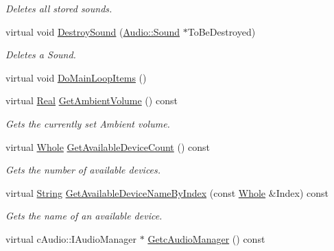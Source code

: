 \begin{DoxyCompactItemize}
\begin{DoxyCompactList}\small\item\em Deletes all stored sounds. \item\end{DoxyCompactList}\item 
virtual void \hyperlink{classMezzanine_1_1AudioManager_a6cd0e2faa6913722551a68b9a536c7dd}{DestroySound} (\hyperlink{classMezzanine_1_1Audio_1_1Sound}{Audio::Sound} $\ast$ToBeDestroyed)
\begin{DoxyCompactList}\small\item\em Deletes a Sound. \item\end{DoxyCompactList}\item 
virtual void \hyperlink{classMezzanine_1_1AudioManager_aefcdc7d3276500cf627f2c2e33b483f3}{DoMainLoopItems} ()
\item 
virtual \hyperlink{namespaceMezzanine_a726731b1a7df72bf3583e4a97282c6f6}{Real} \hyperlink{classMezzanine_1_1AudioManager_acb9f1413ab2260c181ded3ddca71d0dd}{GetAmbientVolume} () const 
\begin{DoxyCompactList}\small\item\em Gets the currently set Ambient volume. \item\end{DoxyCompactList}\item 
virtual \hyperlink{namespaceMezzanine_adcbb6ce6d1eb4379d109e51171e2e493}{Whole} \hyperlink{classMezzanine_1_1AudioManager_ae340f137877d14d965e4f47463f2a84a}{GetAvailableDeviceCount} () const 
\begin{DoxyCompactList}\small\item\em Gets the number of available devices. \item\end{DoxyCompactList}\item 
virtual \hyperlink{namespaceMezzanine_acf9fcc130e6ebf08e3d8491aebcf1c86}{String} \hyperlink{classMezzanine_1_1AudioManager_a753f4954528c5845d5fcb97e938594ed}{GetAvailableDeviceNameByIndex} (const \hyperlink{namespaceMezzanine_adcbb6ce6d1eb4379d109e51171e2e493}{Whole} \&Index) const 
\begin{DoxyCompactList}\small\item\em Gets the name of an available device. \item\end{DoxyCompactList}\item 
virtual cAudio::IAudioManager $\ast$ \hyperlink{classMezzanine_1_1AudioManager_ab90e81d0e2bac51ad3552c627cde9336}{GetcAudioManager} () const 

\end{DoxyCompactItemize}
